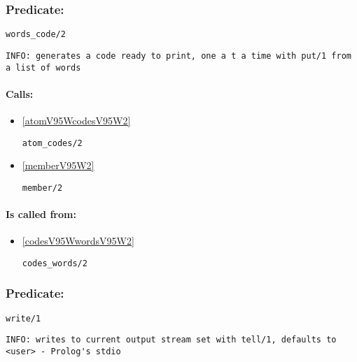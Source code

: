 \subsubsection{Predicate:} \label{wordsV95WcodeV95W2}

\begin{verbatim}
words_code/2
\end{verbatim}

{\small \begin{verbatim}
INFO: generates a code ready to print, one a t a time with put/1 from a list of words

\end{verbatim}}
\paragraph{Calls:} 
\begin{itemize}
\item \ref{atomV95WcodesV95W2} 
\begin{verbatim}
atom_codes/2
\end{verbatim}

\item \ref{memberV95W2} 
\begin{verbatim}
member/2
\end{verbatim}

\end{itemize}
\paragraph{Is called from:} 
\begin{itemize}
\item \ref{codesV95WwordsV95W2} 
\begin{verbatim}
codes_words/2
\end{verbatim}

\end{itemize}

\subsubsection{Predicate:} \label{writeV95W1}

\begin{verbatim}
write/1
\end{verbatim}

{\small \begin{verbatim}
INFO: writes to current output stream set with tell/1, defaults to <user> - Prolog's stdio

\end{verbatim}}
